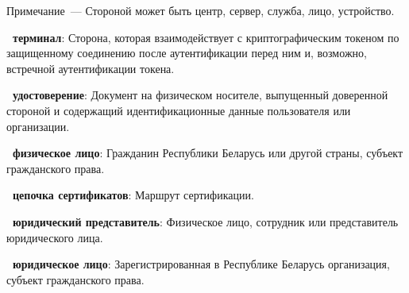 \begin{note}
Примечание~--- Стороной может быть центр, сервер, служба, лицо, устройство.
\end{note}

{\bf\thedefctr~терминал}: 
Сторона, которая взаимодействует с криптографическим токеном по 
защищенному соединению после аутентификации перед ним и, возможно, 
встречной аутентификации токена.  

{\bf\thedefctr~удостоверение}: 
Документ на физическом носителе, выпущенный доверенной 
стороной и содержащий идентификационные данные пользователя или 
организации.

{\bf\thedefctr~физическое лицо}: 
Гражданин Республики Беларусь или другой страны,
субъект гражданского права. 

{\bf\thedefctr~цепочка сертификатов}: 
Маршрут сертификации.

{\bf\thedefctr~юридический представитель}: 
Физическое лицо, сотрудник или представитель юридического лица.

{\bf\thedefctr~юридическое лицо}:
Зарегистрированная в Республике Беларусь организация, 
субъект гражданского права.

